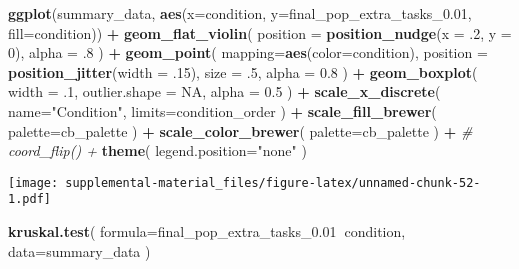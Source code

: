 \documentclass[]{book}
\newenvironment{Shaded}{\begin{snugshade}}{\end{snugshade}}
\newcommand{\CommentTok}[1]{\textcolor[rgb]{0.56,0.35,0.01}{\textit{#1}}}
\newcommand{\DataTypeTok}[1]{\textcolor[rgb]{0.13,0.29,0.53}{#1}}
\newcommand{\DecValTok}[1]{\textcolor[rgb]{0.00,0.00,0.81}{#1}}
\newcommand{\FloatTok}[1]{\textcolor[rgb]{0.00,0.00,0.81}{#1}}
\newcommand{\KeywordTok}[1]{\textcolor[rgb]{0.13,0.29,0.53}{\textbf{#1}}}
\newcommand{\NormalTok}[1]{#1}
\newcommand{\OperatorTok}[1]{\textcolor[rgb]{0.81,0.36,0.00}{\textbf{#1}}}
\newcommand{\OtherTok}[1]{\textcolor[rgb]{0.56,0.35,0.01}{#1}}
\newcommand{\StringTok}[1]{\textcolor[rgb]{0.31,0.60,0.02}{#1}}
\begin{document}
\begin{Shaded}
\begin{Highlighting}[]
\KeywordTok{ggplot}\NormalTok{(summary_data, }\KeywordTok{aes}\NormalTok{(}\DataTypeTok{x=}\NormalTok{condition, }\DataTypeTok{y=}\NormalTok{final_pop_extra_tasks_}\FloatTok{0.01}\NormalTok{, }\DataTypeTok{fill=}\NormalTok{condition)) }\OperatorTok{+}
\StringTok{  }\KeywordTok{geom_flat_violin}\NormalTok{(}
    \DataTypeTok{position =} \KeywordTok{position_nudge}\NormalTok{(}\DataTypeTok{x =} \FloatTok{.2}\NormalTok{, }\DataTypeTok{y =} \DecValTok{0}\NormalTok{),}
    \DataTypeTok{alpha =} \FloatTok{.8}
\NormalTok{  ) }\OperatorTok{+}
\StringTok{  }\KeywordTok{geom_point}\NormalTok{(}
    \DataTypeTok{mapping=}\KeywordTok{aes}\NormalTok{(}\DataTypeTok{color=}\NormalTok{condition),}
    \DataTypeTok{position =} \KeywordTok{position_jitter}\NormalTok{(}\DataTypeTok{width =} \FloatTok{.15}\NormalTok{),}
    \DataTypeTok{size =} \FloatTok{.5}\NormalTok{,}
    \DataTypeTok{alpha =} \FloatTok{0.8}
\NormalTok{  ) }\OperatorTok{+}
\StringTok{  }\KeywordTok{geom_boxplot}\NormalTok{(}
    \DataTypeTok{width =} \FloatTok{.1}\NormalTok{,}
    \DataTypeTok{outlier.shape =} \OtherTok{NA}\NormalTok{,}
    \DataTypeTok{alpha =} \FloatTok{0.5}
\NormalTok{  ) }\OperatorTok{+}
\StringTok{  }\KeywordTok{scale_x_discrete}\NormalTok{(}
    \DataTypeTok{name=}\StringTok{"Condition"}\NormalTok{,}
    \DataTypeTok{limits=}\NormalTok{condition_order}
\NormalTok{  ) }\OperatorTok{+}
\StringTok{  }\KeywordTok{scale_fill_brewer}\NormalTok{(}
    \DataTypeTok{palette=}\NormalTok{cb_palette}
\NormalTok{  ) }\OperatorTok{+}
\StringTok{  }\KeywordTok{scale_color_brewer}\NormalTok{(}
    \DataTypeTok{palette=}\NormalTok{cb_palette}
\NormalTok{  ) }\OperatorTok{+}
\StringTok{  }\CommentTok{# coord_flip() +}
\StringTok{  }\KeywordTok{theme}\NormalTok{(}
    \DataTypeTok{legend.position=}\StringTok{"none"}
\NormalTok{  )}
\end{Highlighting}
\end{Shaded}

\texttt{[image: supplemental-material\_files/figure-latex/unnamed-chunk-52-1.pdf]}

\begin{Shaded}
\begin{Highlighting}[]
\KeywordTok{kruskal.test}\NormalTok{(}
  \DataTypeTok{formula=}\NormalTok{final_pop_extra_tasks_}\FloatTok{0.01}\OperatorTok{~}\NormalTok{condition,}
  \DataTypeTok{data=}\NormalTok{summary_data}
\NormalTok{)}
\end{Highlighting}
\end{Shaded}
\end{document}

